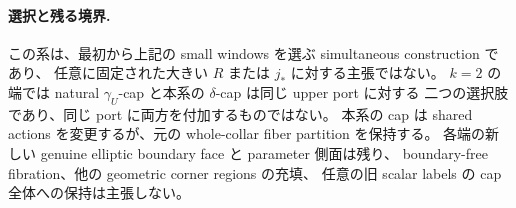 \paragraph{選択と残る境界.}
この系は、最初から上記の small windows を選ぶ simultaneous construction であり、
任意に固定された大きい $R$ または $j_*$ に対する主張ではない。
$k=2$ の端では natural $\gamma_U$-cap と本系の $\delta$-cap は同じ upper port に対する
二つの選択肢であり、同じ port に両方を付加するものではない。
本系の cap は shared actions を変更するが、元の whole-collar fiber partition を保持する。
各端の新しい genuine elliptic boundary face と parameter 側面は残り、
boundary-free fibration、他の geometric corner regions の充填、
任意の旧 scalar labels の cap 全体への保持は主張しない。
